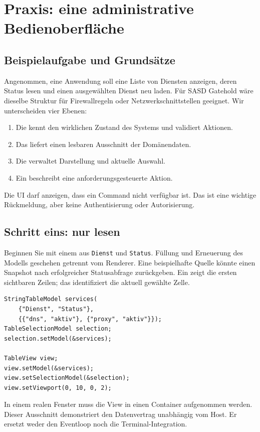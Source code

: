 \chapter{Praxis: eine administrative Bedienoberfläche}\label{chap:practice}

\section{Beispielaufgabe und Grundsätze}
Angenommen, eine Anwendung soll eine Liste
von Diensten anzeigen, deren Status lesen
und einen ausgewählten Dienst neu laden.
Für SASD Gatehold wäre dieselbe
Struktur für Firewallregeln oder
Netzwerkschnittstellen geeignet.
Wir unterscheiden vier Ebenen:
\begin{enumerate}
\item Die  kennt den wirklichen
Zustand des Systems und validiert Aktionen.
\item Das  liefert einen
lesbaren Ausschnitt der Domänendaten.
\item Die  verwaltet Darstellung
und aktuelle Auswahl.
\item Ein  beschreibt
eine anforderungsgesteuerte Aktion.
\end{enumerate}
Die UI darf anzeigen, dass ein Command
nicht verfügbar ist. Das ist eine
wichtige Rückmeldung, aber keine
Authentisierung oder Autorisierung.

\section{Schritt eins: nur lesen}
Beginnen Sie mit einem 
aus \texttt{Dienst} und \texttt{Status}.
Füllung und Erneuerung des Modells
geschehen getrennt vom Renderer.
Eine beispielhafte Quelle könnte einen
Snapshot nach erfolgreicher Statusabfrage
zurückgeben. Ein 
zeigt die ersten sichtbaren Zeilen;
das 
identifiziert die aktuell gewählte Zelle.

\begin{lstlisting}[language=SASDCpp]
StringTableModel services(
    {"Dienst", "Status"},
    {{"dns", "aktiv"}, {"proxy", "aktiv"}});
TableSelectionModel selection;
selection.setModel(&services);

TableView view;
view.setModel(&services);
view.setSelectionModel(&selection);
view.setViewport(0, 10, 0, 2);
\end{lstlisting}
In einem realen Fenster muss die View in
einen Container aufgenommen werden.
Dieser Ausschnitt demonstriert den
Datenvertrag unabhängig vom Host.
Er ersetzt weder den Eventloop
noch die Terminal-Integration.


